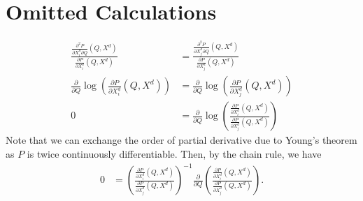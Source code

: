 \documentclass[11pt, a4paper]{article}
\theoremstyle{remark}
\begin{document}
\appendix

\section{Omitted Calculations}\label{omitted_calculation}


\begin{align}
    \frac{\frac{\partial^2 P}{\partial X^{d}_{i} \partial Q}(Q, X^{d})}{\frac{\partial P}{\partial X^{d}_{i}}(Q, X^{d})}  & = \frac{\frac{\partial^2 P}{\partial X^{d}_{j} \partial Q}(Q, X^{d})}{\frac{\partial P}{\partial X^{d}_{j}}(Q, X^{d})}\\ 
    \frac{\partial }{\partial Q} \log\left( \frac{\partial P}{\partial X^{d}_{i}}(Q, X^{d})\right) &= \frac{\partial }{\partial Q} \log\left( \frac{\partial P}{\partial X^{d}_{j}}(Q, X^{d})\right)\\
    0& = \frac{\partial}{\partial Q}\log\left(\frac{\frac{\partial P}{\partial X^{d}_{i}}(Q, X^{d})}{\frac{\partial P}{\partial X^{d}_{j}}(Q, X^{d})}\right)
\end{align}
Note that we can exchange the order of partial derivative due to Young's theorem as $P$ is twice continuously differentiable.
Then, by the chain rule, we have
\begin{align}
    0 & = \left(\frac{\frac{\partial P}{\partial X^{d}_{i}}(Q, X^{d})}{\frac{\partial P}{\partial X^{d}_{j}}(Q, X^{d})}\right)^{-1} \frac{\partial}{\partial Q} \left(\frac{\frac{\partial P}{\partial X^{d}_{i}}(Q, X^{d})}{\frac{\partial P}{\partial X^{d}_{j}}(Q, X^{d})}\right).
\end{align}
\end{document}
